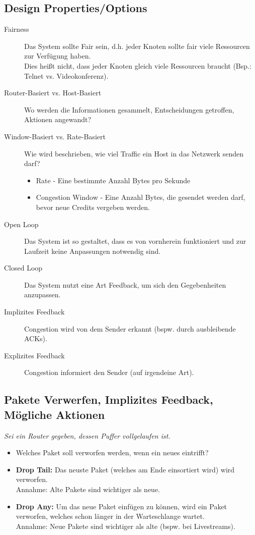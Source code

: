 \documentclass[a4paper, 11pt, accentcolor = tud3b]{tudreport}
\begin{document}
            \subsection{Design Properties/Options}
                \begin{description}
                	\item[Fairness] Das System sollte Fair sein, d.h. jeder Knoten sollte fair viele Ressourcen zur Verfügung haben. \\ Dies heißt nicht, dass jeder Knoten gleich viele Ressourcen braucht (Bsp.: Telnet vs. Videokonferenz).
                	\item[Router-Basiert vs. Host-Basiert] Wo werden die Informationen gesammelt, Entscheidungen getroffen, Aktionen angewandt?
                	\item[Window-Basiert vs. Rate-Basiert] Wie wird beschrieben, wie viel Traffic ein Host in das Netzwerk senden darf?
	                	\begin{itemize}
	                		\item Rate - Eine bestimmte Anzahl Bytes pro Sekunde
	                		\item Congestion Window - Eine Anzahl Bytes, die gesendet werden darf, bevor neue Credits vergeben werden.
	                	\end{itemize}
                	\item[Open Loop] Das System ist so gestaltet, dass es von vornherein funktioniert und zur Laufzeit keine Anpassungen notwendig sind.
                	\item[Closed Loop] Das System nutzt eine Art Feedback, um sich den Gegebenheiten anzupassen.
                	\item[Implizites Feedback] Congestion wird von dem Sender erkannt (bspw. durch ausbleibende ACKs).
                	\item[Explizites Feedback] Congestion informiert den Sender (auf irgendeine Art).
                \end{description}

            \subsection{Pakete Verwerfen, Implizites Feedback, Mögliche Aktionen}
	            \textit{Sei ein Router gegeben, dessen Puffer vollgelaufen ist.}
            
	            \begin{itemize}
	            	\item Welches Paket soll verworfen werden, wenn ein neues eintrifft?
	            	\item \textbf{Drop Tail:} Das neuste Paket (welches am Ende einsortiert wird) wird verworfen. \\ Annahme: Alte Pakete sind wichtiger als neue.
	            	\item \textbf{Drop Any:} Um das neue Paket einfügen zu können, wird ein Paket verworfen, welches schon länger in der Warteschlange wartet. \\ Annahme: Neue Pakete sind wichtiger als alte (bspw. bei Livestreams).
	            \end{itemize}
	            
\end{document}
